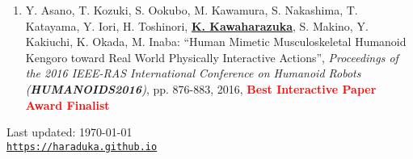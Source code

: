\documentclass[letterpaper]{article}
\def\footerlink{https://haraduka.github.io}
\begin{document}
\begin{enumerate}
\item Y. Asano, T. Kozuki, S. Ookubo, M. Kawamura, S. Nakashima, T. Katayama, Y. Iori, H. Toshinori, \underline{\textbf{K. Kawaharazuka}}, S. Makino, Y. Kakiuchi, K. Okada, M. Inaba: ``Human Mimetic Musculoskeletal Humanoid Kengoro toward Real World Physically Interactive Actions'', \textit{Proceedings of the 2016 IEEE-RAS International Conference on Humanoid Robots (\textit{\textbf{HUMANOIDS2016}})}, pp. 876-883, 2016, \textbf{\textcolor{red}{Best Interactive Paper Award Finalist}}
\end{enumerate}


\bigskip

\begin{center}
  \begin{footnotesize}
    Last updated: \today \\
    \href{\footerlink}{\texttt{\footerlink}}
  \end{footnotesize}
\end{center}
\end{document}
